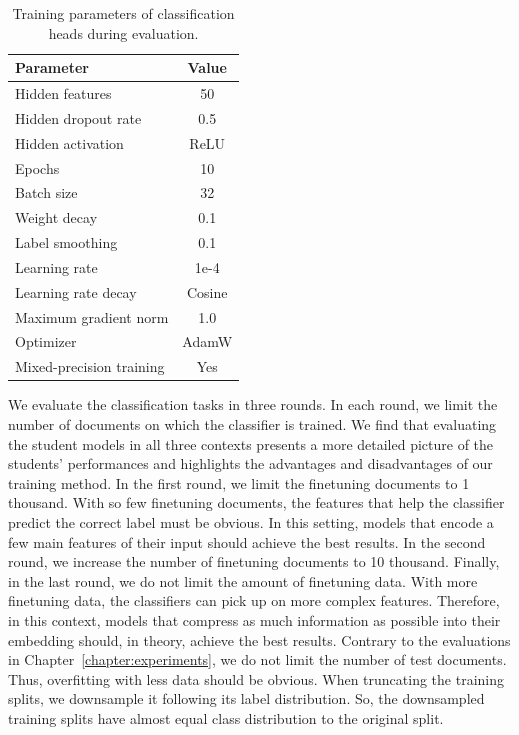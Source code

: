\begin{table}
  \footnotesize
  \centering

  \begin{tabular}{l c}
    \toprule
    Parameter & Value \\
    \midrule
    Hidden features & 50 \\
    Hidden dropout rate & 0.5 \\
    Hidden activation & ReLU \\
    Epochs & 10 \\
    Batch size & 32 \\
    Weight decay & 0.1 \\
    Label smoothing & 0.1 \\
    Learning rate & 1e-4 \\
    Learning rate decay & Cosine \\
    Maximum gradient norm & 1.0 \\
    Optimizer & AdamW \\
    Mixed-precision training & Yes \\
    \bottomrule
  \end{tabular}

  \caption{Training parameters of classification heads during evaluation.}

  \label{table:head_train_eval_params}

\end{table}

We evaluate the classification tasks in three rounds. In each round, we limit
the number of documents on which the classifier is trained. We find that
evaluating the student models in all three contexts presents a more detailed
picture of the students' performances and highlights the advantages and
disadvantages of our training method. In the first round, we limit the
finetuning documents to 1 thousand. With so few finetuning documents, the
features that help the classifier predict the correct label must be obvious. In
this setting, models that encode a few main features of their input should
achieve the best results. In the second round, we increase the number of
finetuning documents to 10 thousand. Finally, in the last round, we do not
limit the amount of finetuning data. With more finetuning data, the classifiers
can pick up on more complex features. Therefore, in this context, models that
compress as much information as possible into their embedding should, in
theory, achieve the best results. Contrary to the evaluations in
Chapter~\ref{chapter:experiments}, we do not limit the number of test
documents. Thus, overfitting with less data should be obvious. When truncating
the training splits, we downsample it following its label distribution. So, the
downsampled training splits have almost equal class distribution to the
original split.

